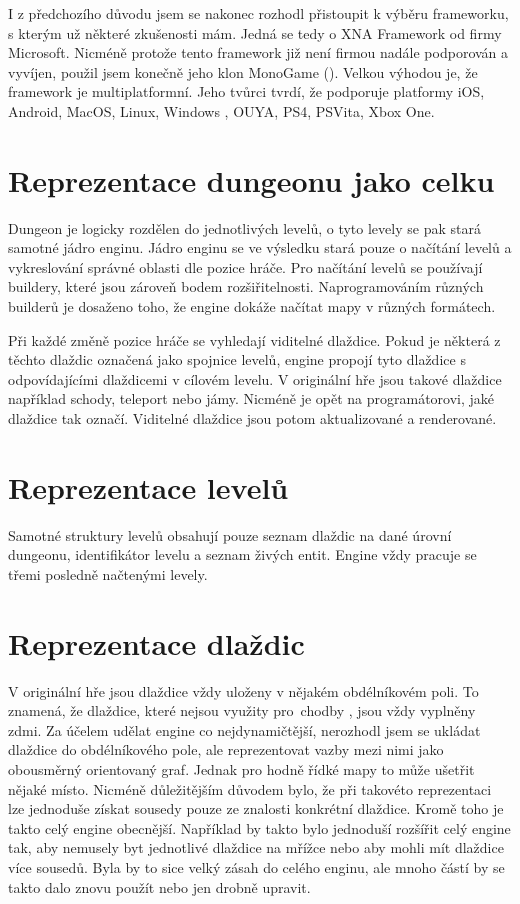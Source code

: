 I z předchozího důvodu jsem se nakonec rozhodl přistoupit k výběru frameworku, s kterým už některé zkušenosti mám. Jedná se 
tedy o XNA Framework od firmy Microsoft. Nicméně protože tento framework již není firmou nadále podporován a vyvíjen, použil jsem 
konečně jeho klon MonoGame (\cite{MonoGame}). Velkou výhodou je, že framework je multiplatformní. Jeho tvůrci tvrdí, že podporuje platformy
iOS, Android, MacOS, Linux, Windows , OUYA, PS4, PSVita, Xbox One.

\section{Reprezentace dungeonu jako celku}
Dungeon je logicky rozdělen do jednotlivých levelů, o tyto levely se pak stará samotné jádro enginu. Jádro enginu se ve výsledku stará
pouze o načítání levelů a vykreslování správné oblasti dle pozice hráče. Pro načítání levelů se používají buildery, které jsou zároveň
bodem rozšiřitelnosti. Naprogramováním různých builderů je dosaženo toho, že engine dokáže načítat mapy v různých formátech.

Při každé změně pozice hráče se vyhledají viditelné dlaždice. Pokud je některá z těchto dlaždic označená jako spojnice levelů,
engine propojí tyto dlaždice s odpovídajícími dlaždicemi v cílovém levelu. V originální hře jsou takové dlaždice například schody,
teleport nebo jámy. Nicméně je opět na programátorovi, jaké dlaždice tak označí. Viditelné dlaždice jsou potom aktualizované a renderované.

\section{Reprezentace levelů}
Samotné struktury levelů obsahují pouze seznam dlaždic na dané úrovní dungeonu, identifikátor levelu a seznam živých entit. 
Engine vždy pracuje se třemi posledně načtenými levely.

\section{Reprezentace dlaždic} 
V originální hře jsou dlaždice vždy uloženy v nějakém obdélníkovém poli. To znamená, že dlaždice, které nejsou využity pro~chodby
, jsou vždy vyplněny zdmi. Za účelem udělat engine co nejdynamičtější, nerozhodl jsem se ukládat dlaždice
do obdélníkového pole, ale reprezentovat vazby mezi nimi jako obousměrný orientovaný graf. Jednak pro hodně řídké mapy to může
ušetřit nějaké místo. Nicméně důležitějším důvodem bylo, že při takovéto reprezentaci lze jednoduše získat sousedy pouze
ze znalosti konkrétní dlaždice. Kromě toho je takto celý engine obecnější. Například by takto bylo jednoduší rozšířit celý engine
tak, aby nemusely byt jednotlivé dlaždice na mřížce nebo aby mohli mít dlaždice více sousedů. Byla by to sice velký zásah do celého 
enginu, ale mnoho částí by se takto dalo znovu použít nebo jen drobně upravit.

